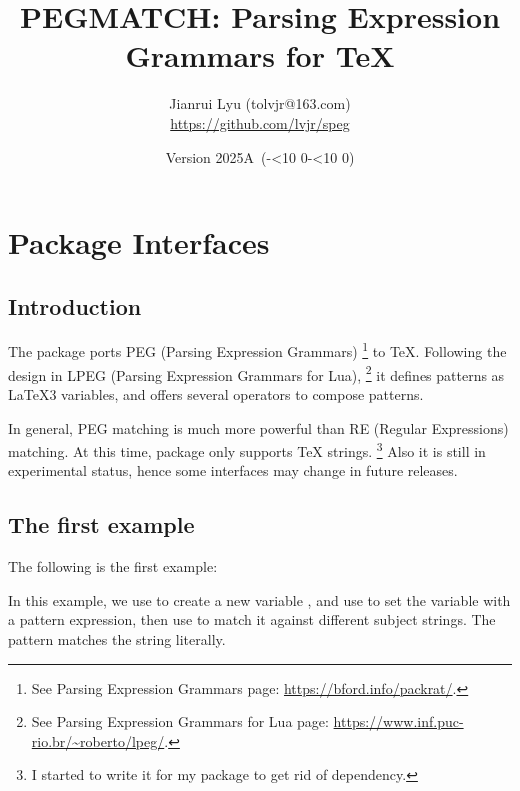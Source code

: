 \documentclass[oneside]{book}
\newcommand*{\myversion}{2025A}
\newcommand*{\mydate}{Version \myversion\ (\the\year-\mylpad\month-\mylpad\day)}
\newcommand*{\mylpad}[1]{\ifnum#1<10 0\the#1\else\the#1\fi}
\begin{document}
\title{\textsf{\color{green3}PEGMATCH: Parsing Expression Grammars for TeX}}
\author{Jianrui Lyu (tolvjr@163.com)\\ \url{https://github.com/lvjr/speg}}
\date{\mydate}
\maketitle

\tableofcontents

\chapter{Package Interfaces}

\section{Introduction}

The  package ports PEG (Parsing Expression Grammars)%
\footnote{See Parsing Expression Grammars page: \url{https://bford.info/packrat/}.} to TeX.
Following the design in LPEG (Parsing Expression Grammars for Lua),%
\footnote{See Parsing Expression Grammars for Lua page: \url{https://www.inf.puc-rio.br/~roberto/lpeg/}.}
it defines patterns as LaTeX3 variables, and offers several operators to compose patterns.

In general, PEG matching is much more powerful than RE (Regular Expressions) matching.
At this time,  package only supports TeX strings.%
\footnote{I started to write it for my  package to get rid of  dependency.}
Also it is still in experimental status, hence some interfaces may change in future releases.

\section{The first example}

The following is the first example:
\begin{demohigh}
\NewSpeg\lMyTestSpeg
\SetSpeg{}
\IfSpegMatchTF{}
\IfSpegMatchTF{}
\IfSpegMatchTF{}
\IfSpegMatchTF{}
\end{demohigh}
In this example, we use \CC{\NewSpeg} to create a new  variable \VV{\lMyTestSpeg},
and use \CC{\SetSpeg} to set the variable with a pattern expression,
then use \CC{\IfSpegMatchTF} to match it against different subject strings.
The pattern  matches the string  literally.
\end{document}
